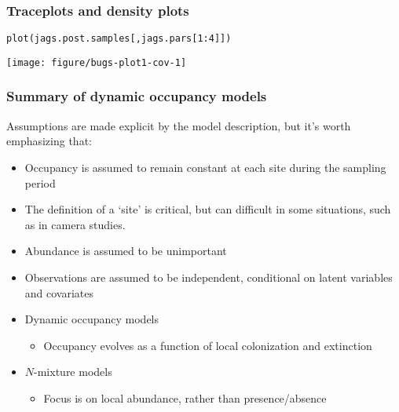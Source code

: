 \documentclass[color=usenames,dvipsnames]{beamer}\usepackage[]{graphicx}\usepackage[]{color}
\makeatletter
\newcommand{\hlnum}[1]{\textcolor[rgb]{0.69,0.494,0}{#1}}%
\newcommand{\hlopt}[1]{\textcolor[rgb]{0,0,0}{#1}}%
\newcommand{\hlstd}[1]{\textcolor[rgb]{0,0,0}{#1}}%
\newcommand{\hlkwd}[1]{\textcolor[rgb]{0.004,0.004,0.506}{#1}}%
\newenvironment{kframe}{%
 \def\at@end@of@kframe{}%
 \ifinner\ifhmode%
  \def\at@end@of@kframe{\end{minipage}}%
  \begin{minipage}{\columnwidth}%
 \fi\fi%
 \def\FrameCommand##1{\hskip\@totalleftmargin \hskip-\fboxsep
 \colorbox{shadecolor}{##1}\hskip-\fboxsep
     \hskip-\linewidth \hskip-\@totalleftmargin \hskip\columnwidth}%
 \MakeFramed {\advance\hsize-\width
   \@totalleftmargin\z@ \linewidth\hsize
   \@setminipage}}%
 {\par\unskip\endMakeFramed%
 \at@end@of@kframe}
\newenvironment{knitrout}{}{} %
\makeatother
\begin{document}
\begin{frame}[fragile]
  \frametitle{Traceplots and density plots}
\begin{knitrout}\footnotesize
{}\color{fgcolor}\begin{kframe}
\begin{alltt}
\hlkwd{plot}\hlstd{(jags.post.samples[,jags.pars[}\hlnum{1}\hlopt{:}\hlnum{4}\hlstd{]])}
\end{alltt}
\end{kframe}

{\centering \texttt{[image: figure/bugs-plot1-cov-1]} 

}



\end{knitrout}
\end{frame}


















\begin{frame}
  \frametitle{Summary of dynamic occupancy models}
  \small
  Assumptions are made explicit by the model description, but it's worth emphasizing that: 
  \begin{itemize}[<+->]
    \item<2-> Occupancy is assumed to remain constant at each site during the sampling period
    \item<3-> The definition of a `site' is critical, but can difficult in
      some situations, such as in camera studies.
    \item<4-> Abundance is assumed to be unimportant
    \item<5-> Observations are assumed to be independent, conditional
      on latent variables and covariates
  \end{itemize}
  \vfill
  \begin{itemize}
    \item<7-> Dynamic occupancy models
    \begin{itemize}
      \item Occupancy evolves as a function of local colonization
        and extinction
    \end{itemize}
    \item<8-> $N$-mixture models
    \begin{itemize}
      \item Focus is on local abundance, rather than presence/absence
    \end{itemize}
  \end{itemize}
  \vfill
\end{frame}
\end{document}
